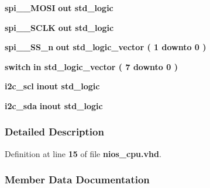 \begin{DoxyCompactItemize}
\item 
{\bf spi\+\_\+\_\+\+M\+O\+SI}  {\bfseries {\bfseries \textcolor{keywordflow}{out}\textcolor{vhdlchar}{ }}} {\bfseries \textcolor{comment}{std\+\_\+logic}\textcolor{vhdlchar}{ }} 
\item 
{\bf spi\+\_\+\_\+\+S\+C\+LK}  {\bfseries {\bfseries \textcolor{keywordflow}{out}\textcolor{vhdlchar}{ }}} {\bfseries \textcolor{comment}{std\+\_\+logic}\textcolor{vhdlchar}{ }} 
\item 
{\bf spi\+\_\+\_\+\+S\+S\+\_\+n}  {\bfseries {\bfseries \textcolor{keywordflow}{out}\textcolor{vhdlchar}{ }}} {\bfseries \textcolor{comment}{std\+\_\+logic\+\_\+vector}\textcolor{vhdlchar}{ }\textcolor{vhdlchar}{(}\textcolor{vhdlchar}{ }\textcolor{vhdlchar}{ } \textcolor{vhdldigit}{1} \textcolor{vhdlchar}{ }\textcolor{keywordflow}{downto}\textcolor{vhdlchar}{ }\textcolor{vhdlchar}{ } \textcolor{vhdldigit}{0} \textcolor{vhdlchar}{ }\textcolor{vhdlchar}{)}\textcolor{vhdlchar}{ }} 
\item 
{\bf switch}  {\bfseries {\bfseries \textcolor{keywordflow}{in}\textcolor{vhdlchar}{ }}} {\bfseries \textcolor{comment}{std\+\_\+logic\+\_\+vector}\textcolor{vhdlchar}{ }\textcolor{vhdlchar}{(}\textcolor{vhdlchar}{ }\textcolor{vhdlchar}{ } \textcolor{vhdldigit}{7} \textcolor{vhdlchar}{ }\textcolor{keywordflow}{downto}\textcolor{vhdlchar}{ }\textcolor{vhdlchar}{ } \textcolor{vhdldigit}{0} \textcolor{vhdlchar}{ }\textcolor{vhdlchar}{)}\textcolor{vhdlchar}{ }} 
\item 
{\bf i2c\+\_\+scl}  {\bfseries {\bfseries \textcolor{keywordflow}{inout}\textcolor{vhdlchar}{ }}} {\bfseries \textcolor{comment}{std\+\_\+logic}\textcolor{vhdlchar}{ }} 
\item 
{\bf i2c\+\_\+sda}  {\bfseries {\bfseries \textcolor{keywordflow}{inout}\textcolor{vhdlchar}{ }}} {\bfseries \textcolor{comment}{std\+\_\+logic}\textcolor{vhdlchar}{ }} 
\end{DoxyCompactItemize}


\subsubsection{Detailed Description}


Definition at line {\bf 15} of file {\bf nios\+\_\+cpu.\+vhd}.



\subsubsection{Member Data Documentation}
